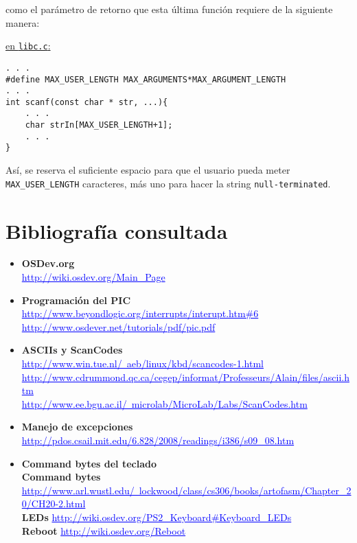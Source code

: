 \documentclass[12pt, a4paper, spanish]{report}
\begin{document}
como el par\'ametro de retorno que esta \'ultima funci\'on requiere de la siguiente manera:\par \noindent \newline
\underline{en \texttt{libc.c}:}
\begin{lstlisting}[style=C]
. . .
#define MAX_USER_LENGTH MAX_ARGUMENTS*MAX_ARGUMENT_LENGTH
. . .
int scanf(const char * str, ...){
    . . .
    char strIn[MAX_USER_LENGTH+1];
    . . .
}
\end{lstlisting}
\par As\'i, se reserva el suficiente espacio para que el usuario pueda meter \texttt{MAX\_USER\_LENGTH} caracteres, m\'as uno para hacer
la string \texttt{null-terminated}.\par \noindent \newline

\chapter*{Bibliograf\'ia consultada}
\begin{itemize}
 \item \textbf{OSDev.org}\\
	\textcolor{blue}{\underline{http://wiki.osdev.org/Main\_Page}}\\
 \item \textbf{Programaci\'on del PIC}\\
	\textbf{}  \textcolor{blue}{\underline{http://www.beyondlogic.org/interrupts/interupt.htm\#6}}\\
	\textbf{}  \textcolor{blue}{\underline{http://www.osdever.net/tutorials/pdf/pic.pdf}}\\
 \item \textbf{ASCIIs y ScanCodes}\\
	\textbf{}  \textcolor{blue}{\underline{http://www.win.tue.nl/~aeb/linux/kbd/scancodes-1.html}}\\
	\textbf{}  \textcolor{blue}{\underline{http://www.cdrummond.qc.ca/cegep/informat/Professeurs/Alain/files/ascii.htm}}\\
	\textbf{}  \textcolor{blue}{\underline{http://www.ee.bgu.ac.il/~microlab/MicroLab/Labs/ScanCodes.htm}}\\
 \item \textbf{Manejo de excepciones}\\
	\textbf{}  \textcolor{blue}{\underline{http://pdos.csail.mit.edu/6.828/2008/readings/i386/s09\_08.htm}}\\
 \item \textbf{Command bytes del teclado}\\
	\textbf{Command bytes}\\
	\textcolor{blue}{\underline{http://www.arl.wustl.edu/~lockwood/class/cs306/books/artofasm/Chapter\_20/CH20-2.html}}\\
	\textbf{LEDs}  \textcolor{blue}{\underline{http://wiki.osdev.org/PS2\_Keyboard\#Keyboard\_LEDs}}\\
	\textbf{Reboot}  \textcolor{blue}{\underline{http://wiki.osdev.org/Reboot}}\\
\end{itemize}
\end{document}
